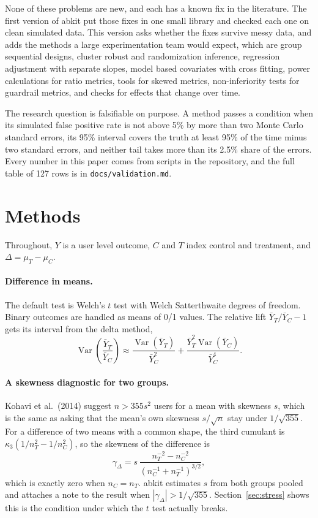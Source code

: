 \documentclass[10pt]{article}
\begin{document}
None of these problems are new, and each has a known fix in the literature. The first version of abkit put those fixes in one small library and checked each one on clean simulated data. This version asks whether the fixes survive messy data, and adds the methods a large experimentation team would expect, which are group sequential designs, cluster robust and randomization inference, regression adjustment with separate slopes, model based covariates with cross fitting, power calculations for ratio metrics, tools for skewed metrics, non-inferiority tests for guardrail metrics, and checks for effects that change over time.

The research question is falsifiable on purpose. A method passes a condition when its simulated false positive rate is not above 5\% by more than two Monte Carlo standard errors, its 95\% interval covers the truth at least 95\% of the time minus two standard errors, and neither tail takes more than its 2.5\% share of the errors. Every number in this paper comes from scripts in the repository, and the full table of 127 rows is in \texttt{docs/validation.md}.

\section{Methods}
Throughout, $Y$ is a user level outcome, $C$ and $T$ index control and treatment, and $\Delta = \mu_T - \mu_C$.

\paragraph{Difference in means.} The default test is Welch's $t$ test with Welch Satterthwaite degrees of freedom. Binary outcomes are handled as means of 0/1 values. The relative lift $\bar Y_T/\bar Y_C - 1$ gets its interval from the delta method,
\[ \operatorname{Var}\!\left(\frac{\bar Y_T}{\bar Y_C}\right) \approx \frac{\operatorname{Var}(\bar Y_T)}{\bar Y_C^2} + \frac{\bar Y_T^2 \operatorname{Var}(\bar Y_C)}{\bar Y_C^4}. \]

\paragraph{A skewness diagnostic for two groups.} Kohavi et al.\ (2014) suggest $n > 355 s^2$ users for a mean with skewness $s$, which is the same as asking that the mean's own skewness $s/\sqrt n$ stay under $1/\sqrt{355}$. For a difference of two means with a common shape, the third cumulant is $\kappa_3(1/n_T^2 - 1/n_C^2)$, so the skewness of the difference is
\[ \gamma_\Delta = s\,\frac{n_T^{-2} - n_C^{-2}}{(n_C^{-1} + n_T^{-1})^{3/2}}, \]
which is exactly zero when $n_C = n_T$. abkit estimates $s$ from both groups pooled and attaches a note to the result when $|\gamma_\Delta| > 1/\sqrt{355}$. Section~\ref{sec:stress} shows this is the condition under which the $t$ test actually breaks.
\end{document}

